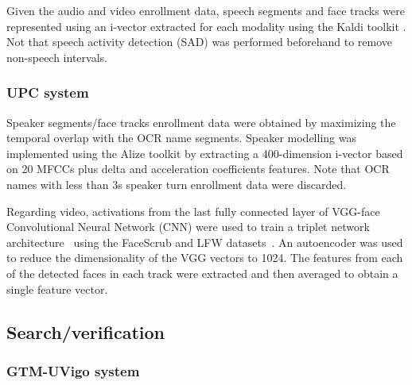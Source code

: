 Given the audio and video enrollment data, speech segments and face tracks were represented using  
an i-vector \cite{dehak10} extracted for each modality using the Kaldi toolkit \cite{kaldi}.
Not that speech activity detection (SAD) was performed beforehand to remove  non-speech intervals. 


\subsubsection{UPC system}
%
Speaker segments/face tracks enrollment data were obtained by maximizing the temporal overlap with the OCR name segments. 
%
Speaker modelling was implemented using the Alize toolkit\cite{Bonastre1} 
by extracting a 400-dimension  i-vector \cite{dehak10} based on  20 MFCCs plus delta and acceleration coefficients features. 
Note that OCR names with less than 3s speaker turn enrollment data were discarded.

Regarding video, activations from the last fully connected layer of VGG-face~\cite{parkhi15deep} Convolutional Neural Network (CNN) 
were used to train a triplet network architecture~\cite{Schroff2015} using the FaceScrub and LFW datasets~\cite{huang2007lfw,ng2014data}. 
An autoencoder was used to reduce the dimensionality of the VGG vectors to 1024. 
The features from each of the detected faces in each track were extracted and then averaged to obtain a single feature vector.

\subsection{Search/verification}

\subsubsection{GTM-UVigo system}

